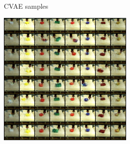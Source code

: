 \begin{figure}
    \begin{subfigure}[b]{0.16\textwidth}
        \center
        CVAE samples \vspace{1.5cm}
    \end{subfigure}
    \begin{subfigure}[b]{0.4\textwidth}
        \center
         {
        }
    \end{subfigure}
    \hspace{0.1cm}
    \begin{subfigure}[b]{0.4\textwidth}
        \center
         {
        \includegraphics[height=252.5px]{ccrig/img/cvae_samples_real_pusher3b.png}
        }
    \end{subfigure}
    \vspace{0.1cm}


\end{figure}
